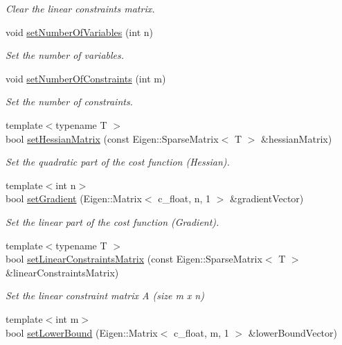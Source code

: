 \begin{DoxyCompactItemize}
\begin{DoxyCompactList}\small\item\em Clear the linear constraints matrix. \end{DoxyCompactList}\item 
void \hyperlink{classOsqpEigen_1_1Data_abd09d8d70fcbaa8db833b87ca0bcbbab}{set\+Number\+Of\+Variables} (int n)
\begin{DoxyCompactList}\small\item\em Set the number of variables. \end{DoxyCompactList}\item 
void \hyperlink{classOsqpEigen_1_1Data_aea746479660e90e46fbf185dca91d936}{set\+Number\+Of\+Constraints} (int m)
\begin{DoxyCompactList}\small\item\em Set the number of constraints. \end{DoxyCompactList}\item 
{\footnotesize template$<$typename T $>$ }\\bool \hyperlink{classOsqpEigen_1_1Data_a58dfe4bfbb1b843736496eea9d0acfb7}{set\+Hessian\+Matrix} (const Eigen\+::\+Sparse\+Matrix$<$ T $>$ \&hessian\+Matrix)
\begin{DoxyCompactList}\small\item\em Set the quadratic part of the cost function (Hessian). \end{DoxyCompactList}\item 
{\footnotesize template$<$int n$>$ }\\bool \hyperlink{classOsqpEigen_1_1Data_a46b476556b8f71326c6827285f10b970}{set\+Gradient} (Eigen\+::\+Matrix$<$ c\+\_\+float, n, 1 $>$ \&gradient\+Vector)
\begin{DoxyCompactList}\small\item\em Set the linear part of the cost function (Gradient). \end{DoxyCompactList}\item 
{\footnotesize template$<$typename T $>$ }\\bool \hyperlink{classOsqpEigen_1_1Data_a202b1b554cad83590bf9999b1ffdf6c5}{set\+Linear\+Constraints\+Matrix} (const Eigen\+::\+Sparse\+Matrix$<$ T $>$ \&linear\+Constraints\+Matrix)
\begin{DoxyCompactList}\small\item\em Set the linear constraint matrix A (size m x n) \end{DoxyCompactList}\item 
{\footnotesize template$<$int m$>$ }\\bool \hyperlink{classOsqpEigen_1_1Data_a2309f26732b40ef31a639ab8d0478e18}{set\+Lower\+Bound} (Eigen\+::\+Matrix$<$ c\+\_\+float, m, 1 $>$ \&lower\+Bound\+Vector)

\end{DoxyCompactItemize}
